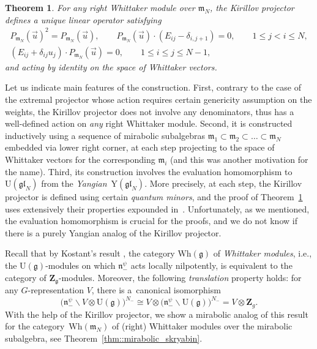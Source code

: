 \documentclass[pdftex]{sigma}
\numberwithin{equation}{section}
\newtheorem{thmx}{Theorem}
\newcommand{\Z}{\mathbf{Z}}
\newcommand{\g}{\mathfrak{g}}
\newcommand{\n}{\mathfrak{n}}
\newcommand{\m}{\mathfrak{m}}
\newcommand{\gl}{\mathfrak{gl}}
\begin{document}
	\begin{thmx}
		\label{intro_thm::main_thm}
		For any right Whittaker module over $\m_N$, the Kirillov projector defines a unique linear operator satisfying
		\begin{gather*}
			P_{\m_N}(\vec{u})^2 = P_{\m_N}(\vec{u}), \qquad
			P_{\m_N} (\vec{u})\cdot (E_{ij} - \delta_{i,j+1}) = 0,\qquad 1 \leq j < i \leq N, \\
			(E_{ij} + \delta_{ij} u_j)\cdot P_{\m_N} (\vec{u}) = 0,\qquad 1 \leq i \leq j \leq N-1,
		\end{gather*}
		and acting by identity on the space of Whittaker vectors.
	\end{thmx}
	
	Let us indicate main features of the construction. First, contrary to the case of the extremal projector whose action requires certain genericity assumption on the weights, the Kirillov projector does not involve any denominators, thus has a well-defined action on \emph{any} right Whittaker module. Second, it is constructed inductively using a sequence of mirabolic subalgebras $\m_1 \subset \m_2 \subset \dots \subset \m_N$ embedded via lower right corner, at each step projecting to the space of Whittaker vectors for the corresponding $\m_i$ (and this was another motivation for the name). Third, its construction involves the evaluation homomorphism to $\mathrm{U}(\gl_N)$ from the \emph{Yangian}~$\mathrm{Y}(\gl_N)$. More precisely, at each step, the Kirillov projector is defined using certain \emph{quantum minors}, and the proof of Theorem~\ref{intro_thm::main_thm} uses extensively their properties expounded in~\cite{MolevYangians}. Unfortunately, as we mentioned, the evaluation homomorphism is crucial for the proofs, and we do not know if there is a purely Yangian analog of the Kirillov projector.
	
	Recall that by Kostant's result \cite{Kostant}, the category $\mathrm{Wh}(\g)$ of \emph{Whittaker modules}, i.e., the $\mathrm{U}(\g)$-modules on which $\n_-^{\psi}$ acts locally nilpotently, is equivalent to the category of $\Z_{\g}$-modules. Moreover, the following \emph{translation} property holds: for any $G$-representation $V$, there is a~canonical isomorphism
	\[
	\bigl(\n_-^{\psi} \backslash V \otimes \mathrm{U}(\g)\bigr)^{N_-} \cong V \otimes \bigl(\n_-^{\psi} \backslash \mathrm{U}(\g)\bigr)^{N_-} = V \otimes \Z_{g}.
	\]
	With the help of the Kirillov projector, we show a mirabolic analog of this result for the category~$\mathrm{Wh}(\m_N)$ of (right) Whittaker modules over the mirabolic subalgebra, see Theorem~\ref{thm::mirabolic_skryabin}.
	
\end{document}
